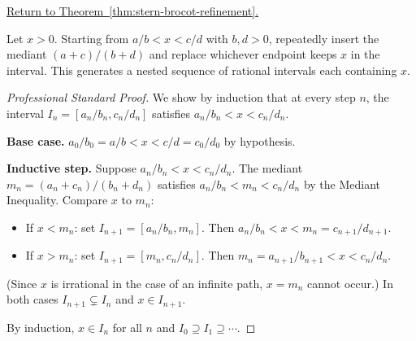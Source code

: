 
\newpage
{}
\label{prf:stern-brocot-refinement}

\begin{remark*}[Return]
\hyperref[thm:stern-brocot-refinement]{Return to Theorem~\ref*{thm:stern-brocot-refinement}.}
\end{remark*}

\begin{theorem*}
Let $x > 0$.  Starting from $a/b < x < c/d$ with $b,d > 0$, repeatedly
insert the mediant $(a+c)/(b+d)$ and replace whichever endpoint keeps $x$
in the interval.  This generates a nested sequence of rational intervals
each containing $x$.
\end{theorem*}

\begin{proof}[Professional Standard Proof]
\LRAProofBodyStart
We show by induction that at every step $n$, the interval
$I_n = [a_n/b_n, c_n/d_n]$ satisfies $a_n/b_n < x < c_n/d_n$.

\textbf{Base case.} $a_0/b_0 = a/b < x < c/d = c_0/d_0$ by hypothesis.

\textbf{Inductive step.} Suppose $a_n/b_n < x < c_n/d_n$.  The mediant
$m_n = (a_n + c_n)/(b_n + d_n)$ satisfies $a_n/b_n < m_n < c_n/d_n$ by the
Mediant Inequality.  Compare $x$ to $m_n$:
\begin{itemize}
  \item If $x < m_n$: set $I_{n+1} = [a_n/b_n, m_n]$.  Then
        $a_n/b_n < x < m_n = c_{n+1}/d_{n+1}$.
  \item If $x > m_n$: set $I_{n+1} = [m_n, c_n/d_n]$.  Then
        $m_n = a_{n+1}/b_{n+1} < x < c_n/d_n$.
\end{itemize}
(Since $x$ is irrational in the case of an infinite path, $x = m_n$
cannot occur.)  In both cases $I_{n+1} \subsetneq I_n$ and $x \in I_{n+1}$.

By induction, $x \in I_n$ for all $n$ and $I_0 \supseteq I_1 \supseteq \cdots$.
\end{proof}

